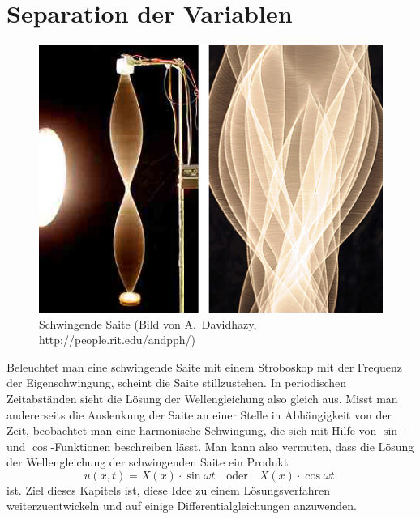 %
%
%
\rhead{}
\chapter{Separation der Variablen\label{chapter-separation}}
\begin{figure}
\begin{center}
\includegraphics[width=0.8\hsize]{../common/graphics/stringvibrlarge-10-06-06.jpg}
\end{center}
\caption{Schwingende Saite (Bild von A.~Davidhazy, http://people.rit.edu/andpph/)
\label{separation:schwingendesaite}}
\end{figure}
Beleuchtet man eine schwingende Saite mit einem Stroboskop mit der
Frequenz der Eigenschwingung, scheint die Saite stillzustehen. 
In periodischen Zeit\-ab\-stän\-den sieht die Lösung der Wellengleichung
also gleich aus.
Misst man andererseits die Auslenkung der Saite
an einer Stelle in Abhängigkeit von der Zeit, beobachtet man
eine harmonische Schwingung, die sich mit Hilfe von $\sin$- und
$\cos$-Funktionen beschreiben lässt. Man kann also vermuten,
dass die Lösung der Wellengleichung der schwingenden Saite
ein Produkt
\[
u(x,t)=X(x)\cdot\sin\omega t\quad\text{oder}\quad X(x)\cdot\cos\omega t.
\]
ist. Ziel dieses Kapitels ist, diese Idee zu einem Lösungsverfahren
weiterzuentwickeln und auf einige Differentialgleichungen anzuwenden.

